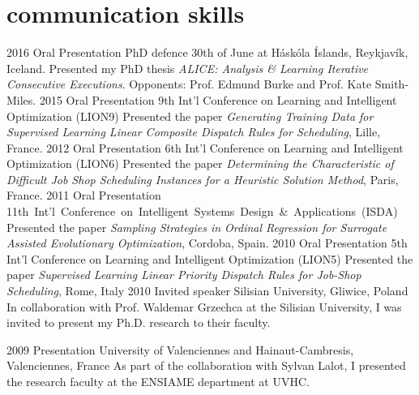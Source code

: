 \documentclass[]{cv} %
\begin{document}
\section{communication skills}
\begin{entrylist}
\entry
{2016}
{Oral Presentation}
{PhD defence 30th of June at Háskóla Íslands, Reykjavík, Iceland.}
{Presented my PhD thesis \emph{ALICE: Analysis \& Learning Iterative 
Consecutive Executions}. 
Opponents: Prof. Edmund Burke and Prof. Kate Smith-Miles.}
\entry
{2015}
{Oral Presentation}
{9th Int'l Conference on Learning and Intelligent Optimization (LION9)}
{Presented the paper \emph{ Generating Training Data for Supervised Learning 
Linear Composite Dispatch Rules for Scheduling}, Lille, France.}
\entry
{2012}
{Oral Presentation}
{6th Int'l Conference on Learning and Intelligent Optimization (LION6)}
{Presented the paper \emph{ Determining the Characteristic of Difficult Job 
Shop Scheduling Instances for a Heuristic Solution Method}, Paris,  France.}
\entry
{2011}
{Oral Presentation}
{\mbox{11th Int'l Conference on Intelligent Systems Design \& Applications (ISDA)}}
{Presented the paper  \emph{Sampling Strategies in Ordinal Regression for 
Surrogate Assisted Evolutionary Optimization}, Cordoba, Spain.}
\entry
{2010}
{Oral Presentation}
{5th Int'l Conference on Learning and Intelligent Optimization (LION5)}
{Presented the paper \emph{Supervised Learning Linear Priority Dispatch Rules 
for Job-Shop Scheduling}, Rome, Italy}
\entry
{2010}
{Invited speaker}
{Silisian University, Gliwice, Poland}
{In collaboration with Prof. Waldemar Grzechca at the Silisian University, I was invited to present my Ph.D. research to their faculty.}
\end{entrylist}
\begin{entrylist}
\entry
{2009}
{Presentation }
{University of Valenciennes and Hainaut-Cambresis, Valenciennes, France}
{As part of the collaboration with Sylvan Lalot, I presented the research faculty at the ENSIAME department at UVHC.}
\end{entrylist}
\end{document}

